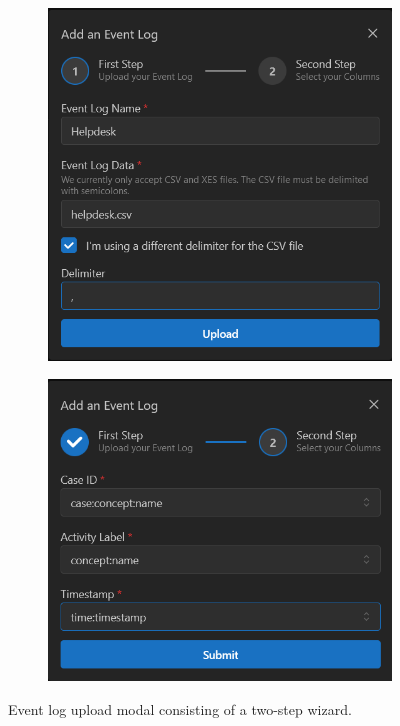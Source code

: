 \begin{figure}[H]
    \centering
    \begin{subfigure}[b]{0.45\textwidth}
        \centering
        \includegraphics[width=\textwidth]{figures/screenshots/upload1.png}
    \end{subfigure}
    \begin{subfigure}[b]{0.45\textwidth}
        \centering
        \includegraphics[width=\textwidth]{figures/screenshots/upload2.png}
    \end{subfigure}
    \caption{Event log upload modal consisting of a two-step wizard.}
    \label{fig:upload-modal}
\end{figure}

